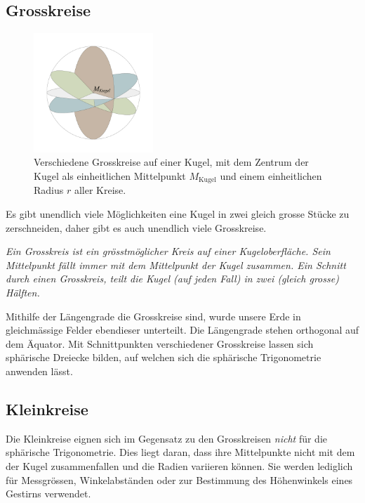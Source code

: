 \begin{refsection}
\subsection{Grosskreise}
\begin{figure}[hbtp]
\centering
\includegraphics[width=0.4\textwidth]{kugel/Grosskreise.jpg}
\caption{Verschiedene Grosskreise auf einer Kugel, mit dem Zentrum der Kugel als einheitlichen Mittelpunkt $M_{\text{Kugel}}$ und einem einheitlichen Radius $r$ aller Kreise.}
\end{figure}

Es gibt unendlich viele Möglichkeiten eine Kugel in zwei gleich grosse Stücke zu zerschneiden, daher gibt es auch unendlich viele Grosskreise.

\begin{definition}
\textit{Ein Grosskreis ist ein grösstmöglicher Kreis auf einer Kugeloberfläche. Sein Mittelpunkt fällt immer mit dem Mittelpunkt der Kugel zusammen. Ein Schnitt durch einen Grosskreis, teilt die Kugel (auf jeden Fall) in zwei (gleich grosse) Hälften.}
\label{skript:kugel:satz:Grosskreis}
\end{definition}

Mithilfe der Längengrade die Grosskreise sind, wurde unsere Erde in gleichmässige Felder ebendieser unterteilt. Die Längengrade stehen orthogonal auf dem Äquator. Mit Schnittpunkten verschiedener Grosskreise lassen sich sphärische Dreiecke bilden, auf welchen sich die sphärische Trigonometrie anwenden lässt.


\subsection{Kleinkreise}
Die Kleinkreise eignen sich im Gegensatz zu den Grosskreisen \textit{nicht} für die sphärische Trigonometrie.  Dies liegt daran, dass ihre Mittelpunkte nicht mit dem der Kugel zusammenfallen und die Radien variieren können.
Sie werden lediglich für Messgrössen, Winkelabständen oder zur Bestimmung des Höhenwinkels eines Gestirns verwendet. 


\end{refsection}
